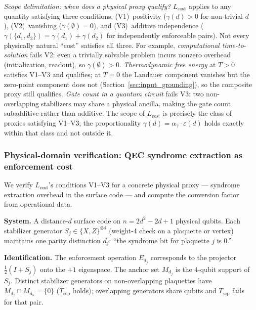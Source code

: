 \documentclass[11pt]{article}
\theoremstyle{remark}
\begin{document}
\smallskip\noindent\textit{Scope delimitation: when does a physical proxy qualify?}  $L_{\mathrm{cost}}$ applies to any quantity satisfying three conditions: (V1)~positivity ($\gamma(d) > 0$ for non-trivial $d$), (V2)~vanishing ($\gamma(\emptyset) = 0$), and (V3)~additive independence ($\gamma(\{d_1, d_2\}) = \gamma(d_1) + \gamma(d_2)$ for independently enforceable pairs).  Not every physically natural ``cost'' satisfies all three.  For example, \emph{computational time-to-solution} fails V2: even a trivially solvable problem incurs nonzero overhead (initialization, readout), so $\gamma(\emptyset) > 0$.  \emph{Thermodynamic free energy} at $T > 0$ satisfies V1--V3 and qualifies; at $T = 0$ the Landauer component vanishes but the zero-point component does not (Section~\ref{sec:input_grounding}), so the composite proxy still qualifies.  \emph{Gate count in a quantum circuit} fails V3: two non-overlapping stabilizers may share a physical ancilla, making the gate count subadditive rather than additive.  The scope of $L_{\mathrm{cost}}$ is precisely the class of proxies satisfying V1--V3; the proportionality $\gamma(d) = \alpha_\gamma \cdot \varepsilon(d)$ holds exactly within that class and not outside it.

\subsubsection*{Physical-domain verification: QEC syndrome extraction as enforcement cost}
\label{sec:Lcost_worked}

We verify $L_{\mathrm{cost}}$'s conditions V1--V3 for a concrete physical proxy --- syndrome extraction overhead in the surface code --- and compute the conversion factor from operational data.

\smallskip\noindent\textbf{System.}  A distance-$d$ surface code on $n = 2d^2 - 2d + 1$ physical qubits.  Each stabilizer generator $S_j \in \{X,Z\}^{\otimes 4}$ (weight-4 check on a plaquette or vertex) maintains one parity distinction $d_j$: ``the syndrome bit for plaquette $j$ is 0.''

\smallskip\noindent\textbf{Identification.}  The enforcement operation $E_{d_j}$ corresponds to the projector $\frac{1}{2}(I + S_j)$ onto the $+1$ eigenspace.  The anchor set $M_{d_j}$ is the 4-qubit support of $S_j$.  Distinct stabilizer generators on non-overlapping plaquettes have $M_{d_j} \cap M_{d_k} = \{0\}$ ($T_{\mathrm{sep}}$ holds); overlapping generators share qubits and $T_{\mathrm{sep}}$ fails for that pair.
\end{document}
